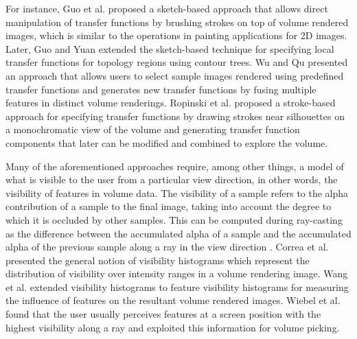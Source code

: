 \documentclass[twoside,twocolumn,10pt]{article}
\begin{document}
For instance, Guo et al. \cite{guo_wysiwyg_2011} proposed a sketch-based approach that allows direct manipulation of transfer functions by brushing strokes on top of volume rendered images, which is similar to the operations in painting applications for 2D images.
Later, Guo and Yuan \cite{guo_local_2013} extended the sketch-based technique for specifying local transfer functions for topology regions using contour trees.
Wu and Qu \cite{wu_interactive_2007} presented an approach that allows users to select sample images rendered using predefined transfer functions and generates new transfer functions by fusing multiple features in distinct volume renderings.
Ropinski et al. \cite{ropinski_stroke-based_2008} proposed a stroke-based approach for specifying transfer functions by drawing strokes near silhouettes on a monochromatic view of the volume and generating transfer function components \cite{castro_transfer_1998} that later can be modified and combined to explore the volume.


Many of the aforementioned approaches require, among other things, a model of what is visible to the user from a particular view direction, in other words, the visibility of features in volume data.
The visibility of a sample refers to the alpha contribution of a sample to the final image, taking into account the degree to which it is occluded by other samples. This can be computed during ray-casting as the difference between the accumulated alpha of a sample and the accumulated alpha of the previous sample along a ray in the view direction \cite{emsenhuber_visibility_2008}.
Correa et al. presented the general notion of visibility histograms \cite{correa_visibility_2011} which represent the distribution of visibility over intensity ranges in a volume rendering image.
Wang et al. \cite{wang_efficient_2011} extended visibility histograms to feature visibility histograms for measuring the influence of features on the resultant volume rendered images.
Wiebel et al. \cite{wiebel_wysiwyp:_2012} found that the user usually perceives features at a screen position with the highest visibility along a ray and exploited this information for volume picking.



\end{document}

